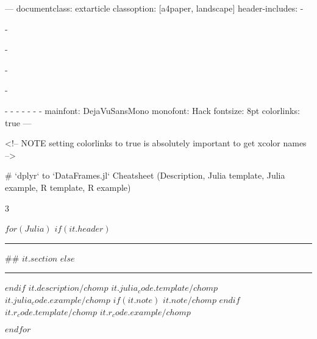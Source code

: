 ---
documentclass: extarticle
classoption: [a4paper, landscape]
header-includes:
  - \usepackage{graphicx}
  - \usepackage[lmargin=1cm,rmargin=1cm,tmargin=1cm,bmargin=1.5cm]{geometry}
  - \usepackage{multicol}
  - \usepackage{fvextra}
  - \usepackage{fancyhdr}
  - 
  - \setlength{\columnsep}{30pt}
  - \setlength{\columnseprule}{1pt}
  - \def\columnseprulecolor{\color{Green}}
  - \newcommand{\myRule}[3][black]{\textcolor{#1}{\rule{#2}{#3}}}
  - \let\Begin\begin
  - \let\End\end
mainfont: DejaVuSansMono
monofont: Hack
fontsize: 8pt
colorlinks: true
---

<!-- NOTE setting colorlinks to true is absolutely important to get xcolor names -->

\pagestyle{fancy}
\fancyhead[LE,RO]{}
\renewcommand{\headrulewidth}{1pt}
\renewcommand{\footrulewidth}{1pt}
\fancyhf[CF]{\thepage}

# `dplyr` to `DataFrames.jl` Cheatsheet \normalsize(Description, Julia template, Julia example, R template, R example)


\Begin{multicols}{3}

$for(Julia)$
$if(it.header)$
\myRule[Green]{\linewidth}{3pt}
\vspace{-20pt}
## $it.section$
$else$
\myRule[Purple]{\linewidth}{3pt}
$endif$ 
\small \textbf{$it.description/chomp$}
\normalsize
$it.julia_code.template/chomp$
\vspace{-5pt}
\small
$it.julia_code.example/chomp$
$if(it.note)$
\footnotesize \emph{$it.note/chomp$}
\small
$endif$
\smallskip
$it.r_code.template/chomp$
\vspace{-10pt}
$it.r_code.example/chomp$
\normalsize

\vspace{-3pt}

$endfor$

\End{multicols}
